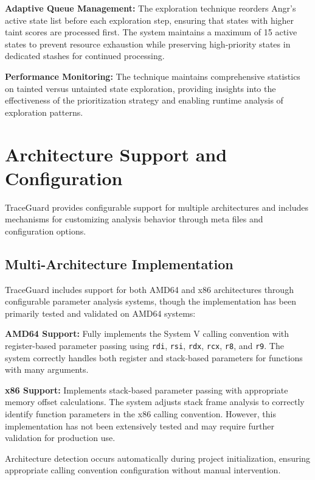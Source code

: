 \textbf{Adaptive Queue Management:} The exploration technique reorders Angr's active state list before each exploration step, ensuring that states with higher taint scores are processed first. The system maintains a maximum of 15 active states to prevent resource exhaustion while preserving high-priority states in dedicated stashes for continued processing.

\textbf{Performance Monitoring:} The technique maintains comprehensive statistics on tainted versus untainted state exploration, providing insights into the effectiveness of the prioritization strategy and enabling runtime analysis of exploration patterns.

\section{Architecture Support and Configuration}\label{sec:architecture_support}

TraceGuard provides configurable support for multiple architectures and includes mechanisms for customizing analysis behavior through meta files and configuration options.

\subsection{Multi-Architecture Implementation}

TraceGuard includes support for both AMD64 and x86 architectures through configurable parameter analysis systems, though the implementation has been primarily tested and validated on AMD64 systems:

\textbf{AMD64 Support:} Fully implements the System V calling convention with register-based parameter passing using \texttt{rdi}, \texttt{rsi}, \texttt{rdx}, \texttt{rcx}, \texttt{r8}, and \texttt{r9}. The system correctly handles both register and stack-based parameters for functions with many arguments.

\textbf{x86 Support:} Implements stack-based parameter passing with appropriate memory offset calculations. The system adjusts stack frame analysis to correctly identify function parameters in the x86 calling convention. However, this implementation has not been extensively tested and may require further validation for production use.

Architecture detection occurs automatically during project initialization, ensuring appropriate calling convention configuration without manual intervention.

